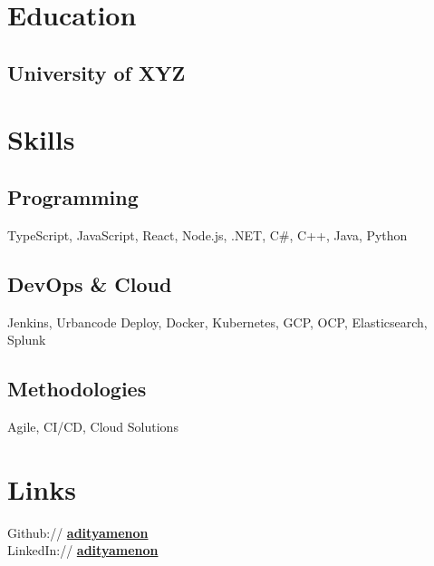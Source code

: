 \documentclass[]{deedy-resume-reversed}
\begin{document}
\begin{minipage}[t]{0.33\textwidth}


\section{Education}
\subsection{University of XYZ}
\sectionsep


\section{Skills}
\subsection{Programming}
TypeScript, JavaScript, React, Node.js, .NET, C#, C++, Java, Python
\sectionsep

\subsection{DevOps & Cloud}
Jenkins, Urbancode Deploy, Docker, Kubernetes, GCP, OCP, Elasticsearch, Splunk
\sectionsep

\subsection{Methodologies}
Agile, CI/CD, Cloud Solutions
\sectionsep


\section{Links}
Github:// \href{https://github.com/adityamenon}{\bf adityamenon} \\
LinkedIn:// \href{https://www.linkedin.com/in/adityamenon}{\bf adityamenon}
\sectionsep

\end{minipage}
\end{document}
